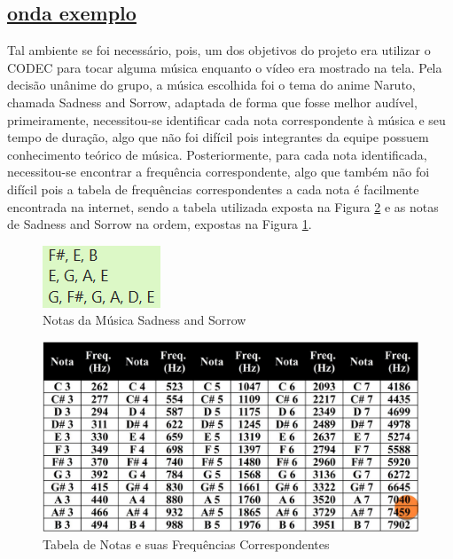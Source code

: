 \documentclass[14pt, oneside]{book}
\theoremstyle{definition}
\begin{document}
                \subsection[onda exemplo]{\hyperlink{toc}{onda exemplo}}
                    Tal ambiente se foi necessário, pois, um dos objetivos do projeto era utilizar o CODEC para tocar alguma música enquanto o vídeo era mostrado na tela. Pela decisão unânime do grupo, a música escolhida foi o tema do anime Naruto, chamada Sadness and Sorrow, adaptada de forma que fosse melhor audível, primeiramente, necessitou-se identificar cada nota correspondente à música e seu tempo de duração, algo que não foi difícil pois integrantes da equipe possuem conhecimento teórico de música. Posteriormente, para cada nota identificada, necessitou-se encontrar a frequência correspondente, algo que também não foi difícil pois a tabela de frequências correspondentes a cada nota é facilmente encontrada na internet, sendo a tabela utilizada exposta na Figura \ref{fig:tabela} e as notas de Sadness and Sorrow na ordem, expostas na Figura \ref{fig:notas}.
                    \begin{figure}[!h]
                        \centering
                        \includegraphics[scale=1]{notas.png}
                        \caption{Notas da Música Sadness and Sorrow}
                        \label{fig:notas}
                    \end{figure}
                    \begin{figure}[!h]
                        \centering
                        \includegraphics[scale=0.7]{tabela.png}
                        \caption{Tabela de Notas e suas Frequências Correspondentes}
                        \label{fig:tabela}
                    \end{figure}
\end{document}
